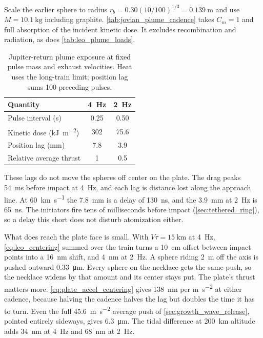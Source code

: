 \documentclass{article}
\begin{document}
Scale the earlier sphere to radius $r_b=0.30(10/100)^{1/3}=\SI{0.139}{\meter}$ and use $M=\SI{10.1}{\kilogram}$ including graphite. \autoref{tab:jovian_plume_cadence} takes $C_m=1$ and full absorption of the incident kinetic dose. It excludes recombination and radiation, as does \autoref{tab:leo_plume_loads}.
\begin{table}[!htpb]
    \centering
    \caption{Jupiter-return plume exposure at fixed pulse mass and exhaust velocities. Heat uses the long-train limit; position lag sums 100 preceding pulses.}
    \label{tab:jovian_plume_cadence}
    \begin{tabular}{|l|c|c|}
        \hline
        Quantity & \SI{4}{\hertz} & \SI{2}{\hertz} \\\hline
        Pulse interval (\si{\second}) & 0.25 & 0.50 \\\hline
        Kinetic dose (\si{\kilo\joule\per\square\meter}) & 302 & 75.6 \\\hline
        Position lag (\si{\milli\meter}) & 7.8 & 3.9 \\\hline
        Relative average thrust & 1 & 0.5 \\\hline
    \end{tabular}
\end{table}

These lags do not move the spheres off center on the plate. The drag peaks \SI{54}{\milli\second} before impact at \SI{4}{\hertz}, and each lag is distance lost along the approach line. At \SI{60}{\kilo\meter\per\second} the \SI{7.8}{\milli\meter} is a delay of \SI{130}{\nano\second}, and the \SI{3.9}{\milli\meter} at \SI{2}{\hertz} is \SI{65}{\nano\second}. The initiators fire tens of milliseconds before impact (\autoref{sec:tethered_ring}), so a delay this short does not disturb atomization either.

What does reach the plate face is small. With $V\tau=\SI{15}{\kilo\meter}$ at \SI{4}{\hertz}, \autoref{eq:leo_centering} summed over the train turns a \SI{10}{\centi\meter} offset between impact points into a \SI{16}{\nano\meter} shift, and \SI{4}{\nano\meter} at \SI{2}{\hertz}. A sphere riding \SI{2}{\meter} off the axis is pushed outward \SI{0.33}{\micro\meter}. Every sphere on the necklace gets the same push, so the necklace widens by that amount and its center stays put. The plate's thrust matters more. \autoref{eq:plate_accel_centering} gives \SI{138}{\nano\meter} per \si{\meter\per\second\squared} at either cadence, because halving the cadence halves the lag but doubles the time it has to turn. Even the full \SI{45.6}{\meter\per\second\squared} average push of \autoref{sec:growth_wave_release}, pointed entirely sideways, gives \SI{6.3}{\micro\meter}. The tidal difference at \SI{200}{\kilo\meter} altitude adds \SI{34}{\nano\meter} at \SI{4}{\hertz} and \SI{68}{\nano\meter} at \SI{2}{\hertz}.
\end{document}
